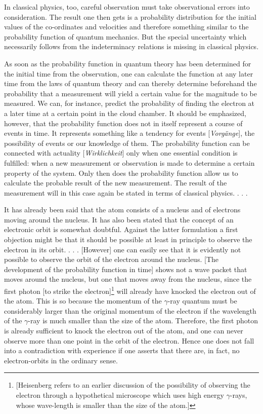 In classical physics, too, careful observation must take observational
errors into consideration. The result one then gets is a probability
distribution for the initial values of the co-ordinates and velocities
and therefore something similar to the probability function of quantum
mechanics. But the special uncertainty which necessarily follows from
the indeterminacy relations is missing in classical physics.

As soon as the probability function in quantum theory has been
determined for the initial time from the observation, one can calculate
the function at any later time from the laws of quantum theory and can
thereby determine beforehand the probability that a measurement will
yield a certain value for the magnitude to be measured. We can, for
instance, predict the probability of finding the electron at a later
time at a certain point in the cloud chamber. It should be emphasized,
however, that the probability function does not in itself represent a
course of events in time. It represents something like a tendency for
events {[}\emph{Vorgänge}{]}, the possibility of events or our knowledge
of them. The probability function can be connected with actuality
{[}\emph{Wirklichkeit}{]} only when one essential condition is
fulfilled: when a new measurement or observation is made to determine a
certain property of the system. Only then does the probability function
allow us to calculate the probable result of the new measurement. The
result of the measurement will in this case again be stated in terms of
classical physics. . . .

It has already been said that the atom consists of a nucleus and of
electrons moving around the nucleus. It has also been stated that the
concept of an electronic orbit is somewhat doubtful. Against the latter
formulation a first objection might be that it should be possible at
least in principle to observe the electron in its orbit. . . .
{[}However{]} one can easily see that it is evidently not possible to
observe the orbit of the electron around the nucleus. {[}The development
of the probability function in time{]} shows not a wave packet that
moves around the nucleus, but one that moves away from the nucleus,
since the first photon {[}to strike the electron{]}\footnote{{[}Heisenberg
  refers to an earlier discussion of the possibility of observing the
  electron through a hypothetical microscope which uses high energy
  $\gamma$-rays, whose wave-length is smaller than the size of the
  atom.{]}} will already have knocked the electron out of the atom. This
is so because the momentum of the $\gamma$-ray quantum must be
considerably larger than the original momentum of the electron if the
wavelength of the $\gamma$-ray is much smaller than the size of the
atom. Therefore, the first photon is already sufficient to knock the
electron out of the atom, and one can never observe more than one point
in the orbit of the electron. Hence one does not fall into a
contradiction with experience if one asserts that there are, in fact, no
electron-orbits in the ordinary sense.

